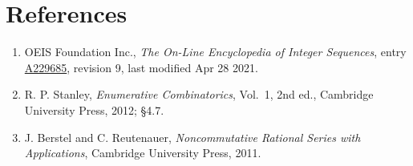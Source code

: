 \documentclass[11pt]{article}
\theoremstyle{definition}
\begin{document}
\section{References}

\begin{enumerate}

\item OEIS Foundation Inc., \emph{The On-Line Encyclopedia of Integer Sequences}, entry \href{https://oeis.org/A229685}{A229685}, revision 9, last modified Apr 28 2021.

\item R. P. Stanley, \emph{Enumerative Combinatorics}, Vol.~1, 2nd ed., Cambridge University Press, 2012; \S4.7.

\item J. Berstel and C. Reutenauer, \emph{Noncommutative Rational Series with Applications}, Cambridge University Press, 2011.

\end{enumerate}
\end{document}
